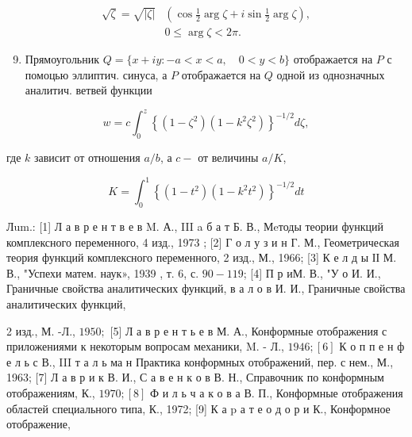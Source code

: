 \documentclass[10pt]{article}
\begin{document}
\[

\begin{aligned}

\sqrt{\zeta}=\sqrt{|\zeta|} & \left(\cos \frac{1}{2} \arg \zeta+i \sin \frac{1}{2} \arg \zeta\right), \\

& 0 \leqslant \arg \zeta<2 \pi .

\end{aligned}

\]



\begin{enumerate}

  \setcounter{enumi}{8}

  \item Прямоугольник $Q=\{x+i y:-a<x<a, \quad 0<y<b\}$ отображается на $P$ с помоцью эллиптич. синуса, а $P$ отображается на $Q$ одной из однозначных аналитич. ветвей функции

\end{enumerate}



\[

w=c \int_{0}^{z}\left\{\left(1-\zeta^{2}\right)\left(1-k^{2} \zeta^{2}\right)\right\}^{-1 / 2} d \zeta,

\]



где $k$ зависит от отношения $a / b$, а $c-$ от величины $a / K$,



\[

K=\int_{0}^{1}\left\{\left(1-t^{2}\right)\left(1-k^{2} t^{2}\right)\right\}^{-1 / 2} d t

\]



Лum.: [1] Л а в р е н т в е в M. А., III a б а т Б. В., Мeтоды теории функций комплексного переменного, 4 изд., 1973 ; [2] Г о л у з и н Г. М., Геометрическая теория функций комплексного переменного, 2 изд., М., 1966; [3] К е л д ы ІІ М. В., "Успехи матем. наук», 1939 , т. 6, с. $90-119$; [4] П р иМ. В., "У о И. И., Граничные свойства аналитических функций, в а л о в И. И., Граничные свойства аналитических функций,

2 изд., М. -Л., $1950 ;$ [5] Л а в р е н т ь е в М. А., Конформные отображения с приложениями к некоторым вопросам механики, M. - Л., $1946 ;[6]$ К о п п е н ф е л ь с В., III т а л ь ма н Практика конформных отображений, пер. с нем., М., 1963; [7] Л а в р и к В. И., С а в е н к о в В. Н., Справочник по конформным отображениям, К., $1970 ;[8]$ Ф и л ь ч а к о в а В. П., Конформные отображения областей специального типа, К., 1972; [9] К а p а т е о д о р и К., Конформное отображение,
\end{document}
